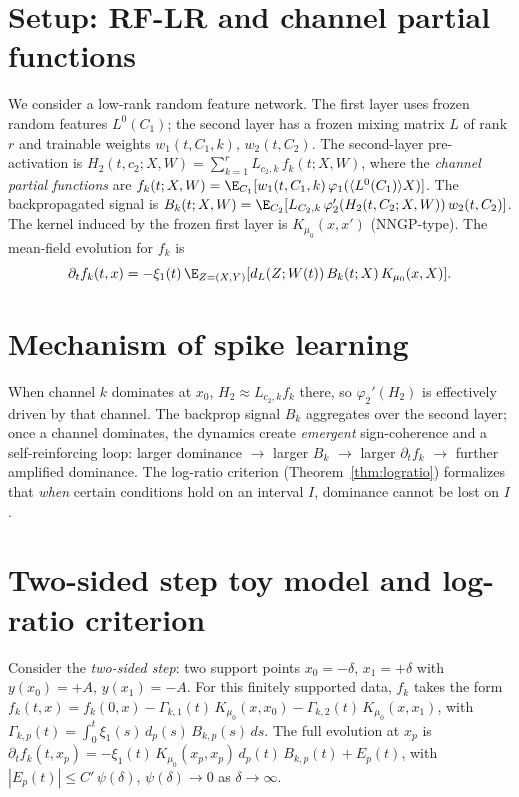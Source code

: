 \documentclass{article}
\theoremstyle{plain}
\theoremstyle{definition}
\newcommand{\ip}[1]{\langle #1 \rangle}
\begin{document}
\section{Setup: RF-LR and channel partial functions}
\label{sec:setup}

We consider a low-rank random feature network. The first layer uses frozen random features $L^0(C_1)$; the second layer has a frozen mixing matrix $L$ of rank $r$ and trainable weights $w_1(t,C_1,k)$, $w_2(t,C_2)$. The second-layer pre-activation is $H_2(t,c_2;X,W) = \sum_{k=1}^r L_{c_2,k}\,f_k(t;X,W)$, where the \emph{channel partial functions} are $f_k(t;X,W) = \E_{C_1}[w_1(t,C_1,k)\,\varphi_1(\ip{L^0(C_1)}{X})]$. The backpropagated signal is $B_k(t;X,W) = \E_{C_2}[L_{C_2,k}\,\varphi_2'(H_2(t,C_2;X,W))\,w_2(t,C_2)]$. The kernel induced by the frozen first layer is $K_{\mu_0}(x,x')$ (NNGP-type). The mean-field evolution for $f_k$ is
\begin{equation}
\label{eq:fk-evol}
\partial_t f_k(t,x) = -\xi_1(t)\,\E_{Z=(X,Y)}[d_L(Z;W(t))\,B_k(t;X)\,K_{\mu_0}(x,X)].
\end{equation}

\section{Mechanism of spike learning}
\label{sec:mechanism}

When channel $k$ dominates at $x_0$, $H_2 \approx L_{c_2,k}f_k$ there, so $\varphi_2'(H_2)$ is effectively driven by that channel. The backprop signal $B_k$ aggregates over the second layer; once a channel dominates, the dynamics create \emph{emergent} sign-coherence and a self-reinforcing loop: larger dominance $\to$ larger $B_k$ $\to$ larger $\partial_t f_k$ $\to$ further amplified dominance. The log-ratio criterion (Theorem~\ref{thm:logratio}) formalizes that \emph{when} certain conditions hold on an interval $I$, dominance cannot be lost on $I$.

\section{Two-sided step toy model and log-ratio criterion}
\label{sec:toy}

Consider the \emph{two-sided step}: two support points $x_0=-\delta$, $x_1=+\delta$ with $y(x_0)=+A$, $y(x_1)=-A$. For this finitely supported data, $f_k$ takes the form $f_k(t,x) = f_k(0,x) - \Gamma_{k,1}(t)\,K_{\mu_0}(x,x_0) - \Gamma_{k,2}(t)\,K_{\mu_0}(x,x_1)$, with $\Gamma_{k,p}(t) = \int_0^t \xi_1(s)\,d_p(s)\,B_{k,p}(s)\,ds$. The full evolution at $x_p$ is $\partial_t f_k(t,x_p) = -\xi_1(t)\,K_{\mu_0}(x_p,x_p)\,d_p(t)\,B_{k,p}(t) + E_p(t)$, with $|E_p(t)|\le C'\,\psi(\delta)$, $\psi(\delta)\to 0$ as $\delta\to\infty$.
\end{document}
